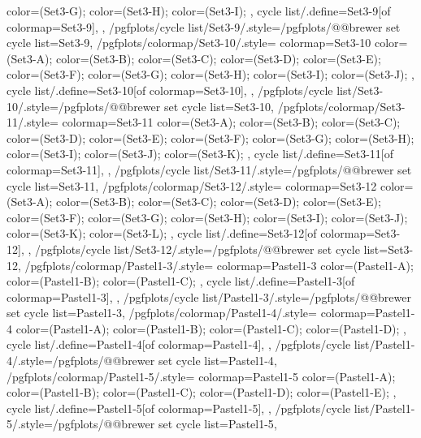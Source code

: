 {{{      color=(Set3-G);
      color=(Set3-H);
      color=(Set3-I);
    },
    cycle list/.define={Set3-9}{[of colormap=Set3-9]},
  },
  /pgfplots/cycle list/Set3-9/.style={/pgfplots/@@brewer set cycle list={Set3-9}},
  /pgfplots/colormap/Set3-10/.style={
    colormap={Set3-10}{
      color=(Set3-A);
      color=(Set3-B);
      color=(Set3-C);
      color=(Set3-D);
      color=(Set3-E);
      color=(Set3-F);
      color=(Set3-G);
      color=(Set3-H);
      color=(Set3-I);
      color=(Set3-J);
    },
    cycle list/.define={Set3-10}{[of colormap=Set3-10]},
  },
  /pgfplots/cycle list/Set3-10/.style={/pgfplots/@@brewer set cycle list={Set3-10}},
  /pgfplots/colormap/Set3-11/.style={
    colormap={Set3-11}{
      color=(Set3-A);
      color=(Set3-B);
      color=(Set3-C);
      color=(Set3-D);
      color=(Set3-E);
      color=(Set3-F);
      color=(Set3-G);
      color=(Set3-H);
      color=(Set3-I);
      color=(Set3-J);
      color=(Set3-K);
    },
    cycle list/.define={Set3-11}{[of colormap=Set3-11]},
  },
  /pgfplots/cycle list/Set3-11/.style={/pgfplots/@@brewer set cycle list={Set3-11}},
  /pgfplots/colormap/Set3-12/.style={
    colormap={Set3-12}{
      color=(Set3-A);
      color=(Set3-B);
      color=(Set3-C);
      color=(Set3-D);
      color=(Set3-E);
      color=(Set3-F);
      color=(Set3-G);
      color=(Set3-H);
      color=(Set3-I);
      color=(Set3-J);
      color=(Set3-K);
      color=(Set3-L);
    },
    cycle list/.define={Set3-12}{[of colormap=Set3-12]},
  },
  /pgfplots/cycle list/Set3-12/.style={/pgfplots/@@brewer set cycle list={Set3-12}},
  /pgfplots/colormap/Pastel1-3/.style={
    colormap={Pastel1-3}{
      color=(Pastel1-A);
      color=(Pastel1-B);
      color=(Pastel1-C);
    },
    cycle list/.define={Pastel1-3}{[of colormap=Pastel1-3]},
  },
  /pgfplots/cycle list/Pastel1-3/.style={/pgfplots/@@brewer set cycle list={Pastel1-3}},
  /pgfplots/colormap/Pastel1-4/.style={
    colormap={Pastel1-4}{
      color=(Pastel1-A);
      color=(Pastel1-B);
      color=(Pastel1-C);
      color=(Pastel1-D);
    },
    cycle list/.define={Pastel1-4}{[of colormap=Pastel1-4]},
  },
  /pgfplots/cycle list/Pastel1-4/.style={/pgfplots/@@brewer set cycle list={Pastel1-4}},
  /pgfplots/colormap/Pastel1-5/.style={
    colormap={Pastel1-5}{
      color=(Pastel1-A);
      color=(Pastel1-B);
      color=(Pastel1-C);
      color=(Pastel1-D);
      color=(Pastel1-E);
    },
    cycle list/.define={Pastel1-5}{[of colormap=Pastel1-5]},
  },
  /pgfplots/cycle list/Pastel1-5/.style={/pgfplots/@@brewer set cycle list={Pastel1-5}},
}
